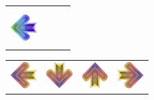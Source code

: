 \begin{center}
\begin{table}[ht]
\begin{minipage}{.5\linewidth}
\begin{tabular}[b]{cccc}
				\\

				  &                                                         
				  &                                                         
				  &                                                         
				\\
				
				  & 

				  &                                                         
				  &                                                         
				\\
				[-20pt]
				\includegraphics[width=1cm]{figures/008/left.png}
				  &                                                         
				  & 

				  &                                                         
				\\
				  &                                                         
				  &                                                         
				  & 
				                    
			\end{tabular}%
			
			\medskip
			\captionsetup{width=0.75\linewidth}
			\label{example-singles}
			    
		\end{minipage}\hfill
		\begin{minipage}{.5\linewidth}
			\centering
			\begin{tabular}[b]{cccc}
				\includegraphics[width=1cm]{figures/receptor/left.png}
				  & \includegraphics[width=1cm]{figures/receptor/down.png}  
				  & \includegraphics[width=1cm]{figures/receptor/up.png}    
				  & \includegraphics[width=1cm]{figures/receptor/right.png} 
				\\
				

\end{tabular}
\end{minipage}
\end{table}
\end{center}
